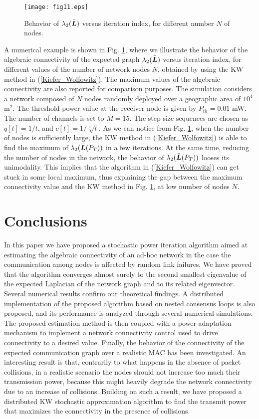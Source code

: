 \documentclass[10pt,twocolumn]{IEEEtran}
\def\bL{\mbox{\boldmath $L$}}
\begin{document}
\begin{figure}[t]
\centering
\texttt{[image: fig11.eps]}
  \caption{Behavior of $\lambda_2(\bar{\bL})$ versus iteration index, for different number $N$ of nodes.}\label{Max_conv}
\end{figure}
A numerical example is shown in Fig. \ref{Max_conv}, where we illustrate the behavior of the algebraic connectivity of the expected graph $\lambda_2(\bar{\bL})$ versus iteration index, for different values of the number of network nodes $N$, obtained by using the KW method in (\ref{Kiefer_Wolfowitz}). The maximum values of the algebraic connectivity are also reported for comparison purposes. The simulation considers a network composed of $N$ nodes randomly deployed over a geographic area of $10^4$ m$^2$. The threshold power value at the receiver node is given by $P_{th}=0.01$ mW. The number of channels is set to $M=15$. The step-size sequences are chosen as $q[t]=1/t$, and $c[t]=1/\sqrt[3]{t}$. As we can notice from Fig. \ref{Max_conv}, when the number of nodes is sufficiently large, the KW method in (\ref{Kiefer_Wolfowitz}) is able to find the maximum of $\lambda_{2}(\bar{\bL}(P_T))$ in a few iterations. At the same time, reducing the number of nodes in the network, the behavior of $\lambda_{2}(\bar{\bL}(P_T))$ looses its unimodality. This implies that the algorithm in (\ref{Kiefer_Wolfowitz}) can get stuck in some local maximum, thus explaining the gap between the maximum connectivity value and the KW method in Fig. \ref{Max_conv}, at low number of nodes $N$.


\section{Conclusions}

In this paper we have proposed a stochastic power iteration algorithm aimed at estimating the algebraic connectivity of an ad-hoc network in the case the communication among nodes is affected by random link failures.  We have proved that the algorithm converges almost surely to the second smallest eigenvalue of the expected Laplacian of the network graph and to its related eigenvector. Several numerical results confirm our theoretical findings. A distributed implementation of the proposed algorithm based on nested consensus loops is also proposed, and its performance is analyzed through several numerical simulations.
The proposed estimation method is then coupled with a power adaptation mechanism to implement a network connectivity
 control used to drive connectivity to a desired value. Finally, the behavior of the connectivity of the expected communication graph over a realistic MAC has been investigated. An interesting result is that, contrarily to what happens in the  absence of packet collisions, in a realistic scenario the nodes should not increase too much their transmission power, because this might heavily degrade the network connectivity due to an increase of collisions. Building on such a result, we have proposed a distributed KW stochastic approximation algorithm to find the transmit power that maximizes the connectivity in the presence of collisions.
\end{document}
